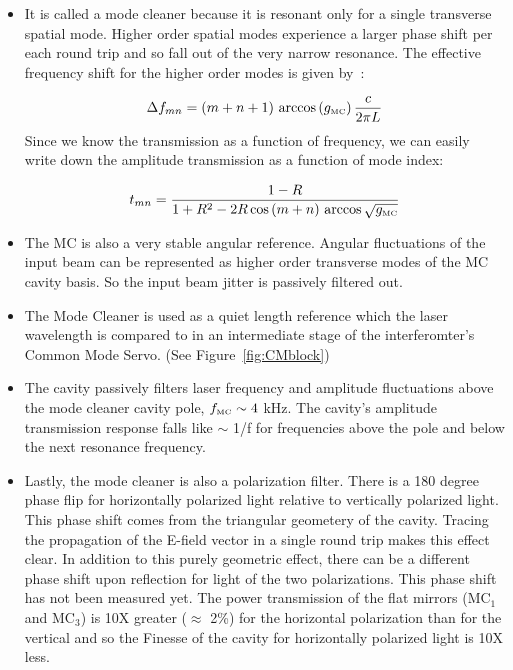 \begin{itemize}
\item It is called a mode cleaner because it is resonant only for
      a single transverse spatial mode. Higher order spatial modes
      experience a larger phase shift per each round trip and so 
      fall out of the very narrow resonance. The effective frequency
      shift for the higher order modes is given by~\cite{Siegman}:

      \begin{equation}
      \Delta f_{mn} = (m + n + 1) \, \arccos{(g_{\mbox{\tiny MC}})} \, \frac{c}{2 \pi L}
      \end{equation}
      Since we know the transmission as a function of frequency, we can
      easily write down the amplitude transmission as a function of
      mode index:

      \begin{equation}
      t_{m n} = \frac{1-R}{1 + R^{2} - 2 R \cos{(m+n) \, 
                          \arccos{\sqrt{g_{\mbox{\tiny MC}}}}}}
      \label{eq:ModeCleaning}
      \end{equation}
 
\item The MC is also a very stable angular reference. Angular fluctuations of 
      the input beam can be represented as higher order transverse modes of the
      MC cavity basis. So the input beam jitter is passively filtered out.

\item The Mode Cleaner is used as a quiet length reference which the
      laser wavelength is compared to in an intermediate stage of the
      interferomter's Common Mode Servo. (See Figure~\ref{fig:CMblock})

\item The cavity passively filters laser frequency and amplitude
      fluctuations above the mode cleaner cavity pole, $f_{\mbox{\tiny MC}} \sim4$ kHz.
      The cavity's amplitude transmission response falls like
       $\sim$ 1/f for frequencies above the pole and below 
      the next resonance frequency.

\item Lastly, the mode cleaner is also a polarization filter. There
      is a 180 degree phase flip for horizontally polarized light
      relative to vertically polarized light. This phase shift comes
      from the triangular geometery of the cavity. Tracing the propagation
      of the E-field vector in a single round trip makes this effect clear.
      In addition to this purely geometric effect, there can be a different
      phase shift upon reflection for light of the two polarizations. This
      phase shift has not been measured yet. The power transmission of the
      flat mirrors (MC$_1$ and MC$_3$) is 10X greater ($\approx$ 2\%) for 
      the horizontal polarization than for the vertical and so the Finesse
      of the cavity for horizontally polarized light is 10X less.

\end{itemize}



